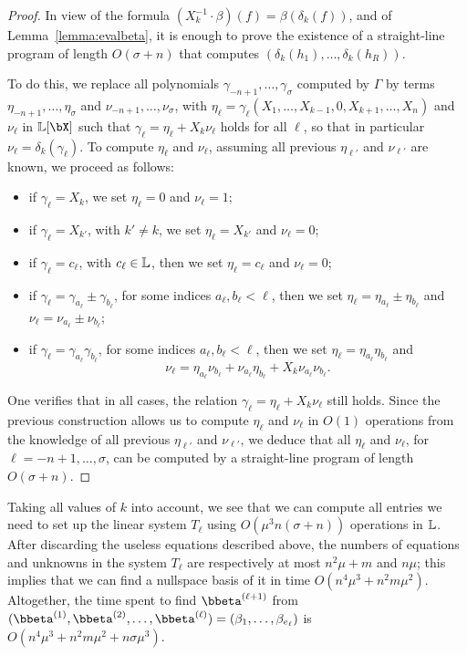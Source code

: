 \documentclass[12pt]{article}
\begin{document}
\begin{proof}
  In view of the formula $(X_k^{-1} \cdot
  \beta)(f)=\beta(\delta_k(f))$, and of Lemma~\ref{lemma:evalbeta}, it is
  enough to prove the existence of a straight-line program of length
  $O(\sigma+n)$ that computes $(\delta_k(h_1),\dots,\delta_k(h_R))$.

  To do this, we replace all polynomials
  $\gamma_{-n+1},\dots,\gamma_\sigma$ computed by $\Gamma$ by terms
  $\eta_{-n+1},\dots,\eta_\sigma$ and $\nu_{-n+1},\dots,\nu_\sigma$,
  with
  $\eta_\ell=\gamma_\ell(X_1,\dots,X_{k-1},0,X_{k+1},\dots,X_n)$
  and $\nu_\ell$ in $\LL[\bX]$ such that
  $\gamma_\ell= \eta_\ell+X_k \nu_\ell$ holds for all $\ell$, so
  that in particular $\nu_\ell=\delta_k(\gamma_\ell)$.  To compute
  $\eta_\ell$ and $\nu_\ell$, assuming all previous
  $\eta_{\ell'}$ and $\nu_{\ell'}$ are known, we proceed as
  follows:
  \begin{itemize}
  \item if $\gamma_\ell=X_k$, we set $\eta_\ell=0$ and $\nu_\ell=1$;
  \item if $\gamma_\ell=X_{k'}$, with $k' \ne k$, we set $\eta_\ell=X_{k'}$ and $\nu_\ell=0$;
  \item if $\gamma_\ell =c_\ell$, with $c_\ell \in \mathbb{L}$,
    then we set $\eta_\ell=c_\ell$ and  $\nu_\ell=0$;
  \item if $\gamma_\ell = \gamma_{a_\ell} \pm \gamma_{b_\ell}$,
    for some indices $a_\ell,b_\ell < \ell$, 
    then we set $\eta_\ell=\eta_{a_\ell}\pm\eta_{b_\ell}$
    and $\nu_\ell=\nu_{a_\ell}\pm\nu_{b_\ell}$;
\item if $\gamma_\ell = \gamma_{a_\ell} \gamma_{b_\ell}$,
      for some indices $a_\ell,b_\ell < \ell$,
    then we set $\eta_\ell=\eta_{a_\ell} \eta_{b_\ell}$
    and $$\nu_\ell=
\eta_{a_\ell} \nu_{b_\ell}
+
\nu_{a_\ell} \eta_{b_\ell}
+
X_k\nu_{a_\ell} \nu_{b_\ell}.$$
\end{itemize}
One verifies that in all cases, the relation $\gamma_\ell=
\eta_\ell+X_k \nu_\ell$ still holds. Since the previous
construction allows us to compute $\eta_\ell$ and $\nu_\ell$ in
$O(1)$ operations from the knowledge of all previous $\eta_{\ell'}$
and $\nu_{\ell'}$, we deduce that all $\eta_\ell$ and $\nu_\ell$,
for $\ell=-n+1,\dots,\sigma$, can be computed by a straight-line program of
length $O(\sigma+n)$.
\end{proof}

Taking all values of $k$ into account, we see that we can compute all
entries we need to set up the linear system $T_\ell$ using $O(\mu^3
n(\sigma+n))$ operations in $\mathbb{L}$. After discarding the useless equations
described above, the numbers of equations and unknowns in the system
$T_\ell$ are respectively at most $n^2 \mu+m$ and $n \mu$; this
implies that we can find a nullspace basis of it in time $O(n^4 \mu^3
+ n^2 m \mu^2)$. Altogether, the time spent to find
$\bbeta^{(\ell+1)}$ from
$(\bbeta^{(1)},\bbeta^{(2)},\dots,\bbeta^{(\ell)})=(\beta_{1},\dots,\beta_{e_\ell})$
is $O(n^4 \mu^3 + n^2 m \mu^2 + n \sigma \mu^3)$.
\end{document}

